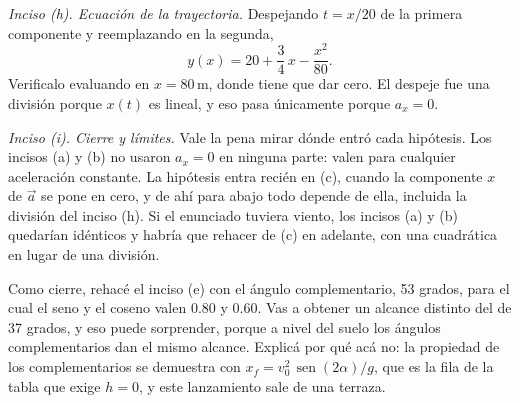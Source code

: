 \documentclass[11pt,openany]{book}
\newcommand{\sen}{\operatorname{sen}}
\begin{document}
\begin{ejemplo}[completo]
\medskip
\textit{Inciso (h). Ecuación de la trayectoria.} Despejando $t = x/20$ de la primera componente y reemplazando en la segunda,
\[
y(x) = 20 + \frac{3}{4}\,x - \frac{x^2}{80}.
\]
Verificalo evaluando en $x = 80\,\mathrm{m}$, donde tiene que dar cero. El despeje fue una división porque $x(t)$ es lineal, y eso pasa únicamente porque $a_x = 0$.

\medskip
\textit{Inciso (i). Cierre y límites.} Vale la pena mirar dónde entró cada hipótesis. Los incisos (a) y (b) no usaron $a_x = 0$ en ninguna parte: valen para cualquier aceleración constante. La hipótesis entra recién en (c), cuando la componente $x$ de $\vec a$ se pone en cero, y de ahí para abajo todo depende de ella, incluida la división del inciso (h). Si el enunciado tuviera viento, los incisos (a) y (b) quedarían idénticos y habría que rehacer de (c) en adelante, con una cuadrática en lugar de una división.

Como cierre, rehacé el inciso (e) con el ángulo complementario, 53 grados, para el cual el seno y el coseno valen 0.80 y 0.60. Vas a obtener un alcance distinto del de 37 grados, y eso puede sorprender, porque a nivel del suelo los ángulos complementarios dan el mismo alcance. Explicá por qué acá no: la propiedad de los complementarios se demuestra con $x_f = v_0^2\,\sen(2\alpha)/g$, que es la fila de la tabla que exige $h = 0$, y este lanzamiento sale de una terraza.
\end{ejemplo}
\end{document}
